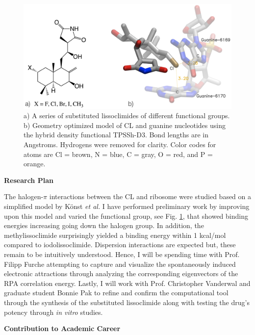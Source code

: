 \documentclass[11pt]{article}
\begin{document}
\begin{figure}
  \vspace{-20pt}
  \centering
  \includegraphics[scale=0.12]{combined.png}
  \caption{a) A series of substituted lissoclimides of different functional groups.
    b) Geometry optimized model of CL and guanine nucleotides using the hybrid
    density functional TPSSh-D3.\autocite{Staroverov03JChemPhys119p12129,Grimme12ChemEurJ18p9955}
    Bond lengths are in Angstroms. Hydrogens were removed for clarity. Color codes
    for atoms are Cl = brown, N = blue, C = gray, O = red, and P = orange.\vspace{-11pt}}
  \label{fig:model}
\end{figure}

\textbf{Research Plan}

The halogen-$\pi$ interactions between the CL and ribosome were
studied based on a simplified model by K{\"o}nst \textit{et al.}\autocite{Konst2017}
I have performed preliminary work by improving upon this model and
varied the functional group, see Fig. \ref{fig:model},
that showed binding energies increasing going down the halogen group. In addition,
the methylissoclimide surprisingly yielded a binding energy within 1
kcal/mol compared to iodolissoclimide. Dispersion interactions are expected
but, these remain to be intuitively understood. Hence, I will be spending time with
Prof. Filipp Furche attempting to capture and visualize the spontaneously induced
electronic attractions through analyzing the corresponding eigenvectors of the RPA
correlation energy. Lastly, I will work with Prof. Christopher Vanderwal and graduate
student Bonnie Pak to refine
and confirm the computational tool through the synthesis of the substituted lissoclimide
along with testing the drug's potency through \textit{in vitro} studies.

\textbf{Contribution to Academic Career}
\end{document}
